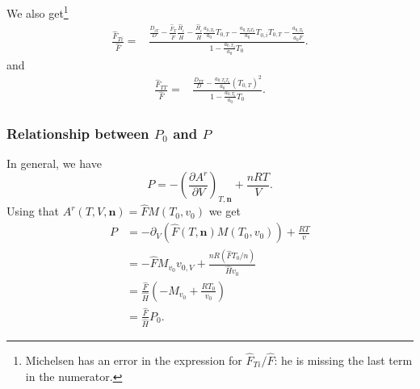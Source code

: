 \documentclass[internal,english]{sintefmemo2012}
\newcommand{\mbn}[0]{\mathbf n}
\newcommand*{\pdersub}[3]{\left(\frac{\partial #1}{\partial #2}\right)_{#3}}
\newcommand*{\hF}[0]{\hat F}
\newcommand*{\hH}[0]{\hat H}
\newcommand{\lp}{\left(}
\newcommand{\rp}{\right)}
\numberwithin{equation}{section}
\begin{document}
We also get\footnote{Michelsen \cite{Michelsen07} has an error in the
  expression for $\hF_{Ti}/\hF$: he is missing the last term in
  the numerator.}
\begin{equation}
  \begin{aligned}
    \frac{\hF_{Ti}}{\hF} =& \frac{ \frac{D_{iT}}{D} -
      \frac{\hF_{T}}{\hF} \frac{\hH_i}{\hH} -
      \frac{\hH_i}{\hH}\frac{a_{0,T_0}}{a_0} T_{0,T} -
      \frac{a_{0,T_0T_0}}{a_0} T_{0,i} T_{0,T} - \frac{a_{0,T_0}}{a_0 \hF}}{1-\frac{a_{0,T_0}}{a_0} T_0}.
  \end{aligned}
\end{equation}
and
\begin{equation}
  \begin{aligned}
    \frac{\hF_{TT}}{\hF} =& \frac{ \frac{D_{TT}}{D} -
      \frac{a_{0,T_0T_0}}{a_0} (T_{0,T})^2}{1-\frac{a_{0,T_0}}{a_0}
      T_0}.
  \end{aligned}
\end{equation}

\subsubsection*{Relationship between $P_0$ and $P$}
In general, we have
$$
P = -\pdersub{A^r}{V}{T,\mbn} + \frac{nRT}{V}.
$$
Using that $A^r(T,V,\mbn) = \hF M(T_0,v_0)$ we get
\begin{align*}
  P &= -\partial_V \lp \hF(T,\mbn) M(T_0,v_0) \rp + \frac{RT}{v} \\
  &= -\hF M_{v_0} v_{0,V} + \frac{nR(\hF T_0/n)}{\hH v_0} \\
  &= \frac{\hF}{\hH} \lp -M_{v_0} + \frac{RT_0}{v_0} \rp \\
  &= \frac{\hF}{\hH} P_0.
\end{align*}
\end{document}
